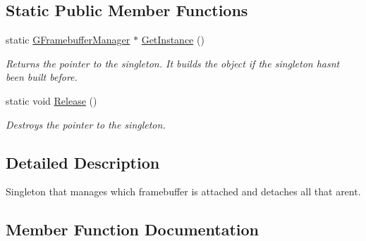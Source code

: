 \subsection*{Static Public Member Functions}
\begin{DoxyCompactItemize}
\item 
\mbox{\label{class_geometry_engine_1_1_geometry_buffer_1_1_g_framebuffer_manager_a313df30129719f492ad9eda870365c9f}} 
static \mbox{\hyperlink{class_geometry_engine_1_1_geometry_buffer_1_1_g_framebuffer_manager}{G\+Framebuffer\+Manager}} $\ast$ \mbox{\hyperlink{class_geometry_engine_1_1_geometry_buffer_1_1_g_framebuffer_manager_a313df30129719f492ad9eda870365c9f}{Get\+Instance}} ()
\begin{DoxyCompactList}\small\item\em Returns the pointer to the singleton. It builds the object if the singleton hasn\textquotesingle{}t been built before. \end{DoxyCompactList}\item 
\mbox{\label{class_geometry_engine_1_1_geometry_buffer_1_1_g_framebuffer_manager_aa9618e690e608d4197b1406faf47a912}} 
static void \mbox{\hyperlink{class_geometry_engine_1_1_geometry_buffer_1_1_g_framebuffer_manager_aa9618e690e608d4197b1406faf47a912}{Release}} ()
\begin{DoxyCompactList}\small\item\em Destroys the pointer to the singleton. \end{DoxyCompactList}\end{DoxyCompactItemize}


\subsection{Detailed Description}
Singleton that manages which framebuffer is attached and detaches all that aren\textquotesingle{}t. 

\subsection{Member Function Documentation}
\mbox{\label{class_geometry_engine_1_1_geometry_buffer_1_1_g_framebuffer_manager_ab4d7a248ecc5cb9849add9961a693ecb}} 
